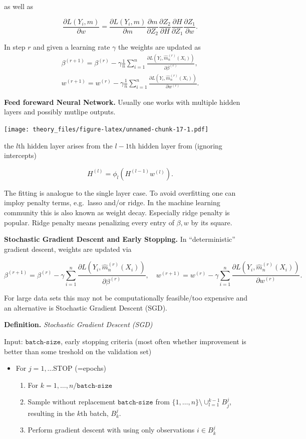 \documentclass[a4paper,12pt,openany]{book}
\providecommand{\tightlist}{%
 \setlength{\itemsep}{0pt}\setlength{\parskip}{0pt}}
\begin{document}
as well as

\[
\frac{\partial L(Y_i,m)}{\partial w}=\frac{\partial L(Y_i,m)}{\partial m}\frac{\partial m}{\partial Z_2} \frac{\partial Z_2}{\partial H} \frac{\partial H}{\partial Z_1}\frac{\partial Z_1}{\partial w}.
\]

In step \(r\) and given a learning rate \(\gamma\) the weights are updated as
\begin{align*}
\beta^{(r+1)}= \beta^{(r)} -\gamma \frac 1 n \sum_{i=1}^n\frac{\partial L(Y_i,\hat m_n^{(r)}(X_i))}{\partial \beta^{(r)}},  \\
w^{(r+1)}= w^{(r)} -\gamma  \frac 1 n \sum_{i=1}^n \frac{\partial L(Y_i,\hat m_n^{(r)}(X_i))}{\partial w^{(r)}}. 
\end{align*}

\textbf{Feed foreward Neural Network.} Usually one works with multiple hidden layers and possibly mutlipe outputs.

\texttt{[image: theory\_files/figure-latex/unnamed-chunk-17-1.pdf]}

the \(l\)th hidden layer arises from the \(l-1\)th hidden layer from (ignoring intercepts)

\[
H^{(l)}=\phi_l(H^{(l-1)}w^{(l)}).
\]

The fitting is analogue to the single layer case. To avoid overfitting one can imploy penalty terms, e.g.~lasso and/or ridge. In the machine learning community this is also known as weight decay. Especially ridge penalty is popular. Ridge penalty means penalizing every entry of \(\beta, w\) by its square.

\textbf{Stochastic Gradient Descent and Early Stopping.} In ``deterministic'' gradient descent, weights are updated via

\[
\beta^{(r+1)}= \beta^{(r)} -\gamma \sum_{i=1}^n\frac{\partial L(Y_i,\hat m_n^{(r)}(X_i))}{\partial \beta^{(r)}},  \quad
w^{(r+1)}= w^{(r)} -\gamma  \sum_{i=1}^n \frac{\partial L(Y_i,\hat m_n^{(r)}(X_i))}{\partial w^{(r)}}.
\]

For large data sets this may not be computationally feasible/too expensive and an alternative is Stochastic Gradient Descent (SGD).

\textbf{Definition.} \emph{Stochastic Gradient Descent (SGD)}

Input: \(\texttt{batch-size}\), early stopping criteria (most often whether improvement is better than some treshold on the validation set)

\begin{itemize}
\tightlist
\item
  For \(j=1,\dots\)STOP (=epochs)

  \begin{enumerate}
  \def\labelenumi{\arabic{enumi}.}
  \tightlist
  \item
    For \(k=1,\dots, n/\texttt{batch-size}\)
  \item
    Sample without replacement \(\texttt{batch-size}\) from \(\{1,\dots,n\}\setminus \cup_{l=1}^{k-1}B_j^j\), resulting in the \(k\)th batch, \(B_k^j\).
  \item
    Perform gradient descent with using only observations \(i \in B_k^j\)
  \end{enumerate}
\end{itemize}
\end{document}
